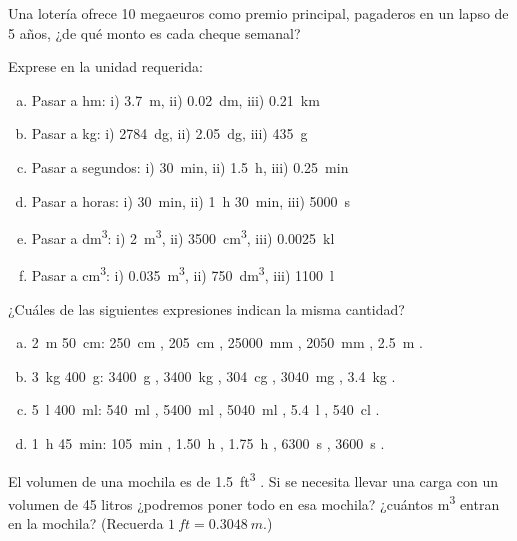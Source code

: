 \documentclass[11pt]{article}
\begin{document}
\begin{pregunta}
Una lotería ofrece 10 megaeuros como premio principal, pagaderos en un lapso de 5 años, ¿de qué monto es cada cheque semanal?
\end{pregunta}

\begin{exercise}
Exprese en la unidad requerida:
\begin{enumerate}[a)]
    \item Pasar a \unit{\hecto m}: i) \qty{3.7}{m}, ii) \qty{0.02}{\deca m}, iii) \qty{0.21}{\km}
    \item Pasar a \unit{\kg}: i) \qty{2784}{\deci g}, ii) \qty{2.05}{\deca g}, iii) \qty{435}{g}
    \item Pasar a segundos: i) \qty{30}{min}, ii) \qty{1.5}{h}, iii) \qty{0.25}{min}
    \item Pasar a horas: i) \qty{30}{min}, ii) \qty{1}{h} \qty{30}{min}, iii) \qty{5000}{s}
    \item Pasar a \unit{\deci m^3}: i) \qty{2}{m^3}, ii) \qty{3500}{cm^3}, iii) \qty{0.0025}{\kilo l}
    \item Pasar a \unit{\cm^3}: i) \qty{0.035}{m^3}, ii) \qty{750}{\deci m^3}, iii) \qty{1100}{l}
\end{enumerate}
\end{exercise}

\begin{exercise}
¿Cuáles de las siguientes expresiones indican la misma cantidad?
\begin{enumerate}[a)]
    \item \qty{2}{m} \qty{50}{cm}: \qty{250}{cm} \blank{}, \qty{205}{cm} \blank{}, \qty{25000}{\mm} \blank{}, \qty{2050}{\mm} \blank{}, \qty{2.5}{m} \blank{}.
    \item \qty{3}{kg} \qty{400}{g}: \qty{3400}{g} \blank{}, \qty{3400}{kg} \blank{}, \qty{304}{\centi g} \blank{}, \qty{3040}{\mg} \blank{}, \qty{3.4}{kg} \blank{}.
    \item \qty{5}{l} \qty{400}{ml}: \qty{540}{ml} \blank{}, \qty{5400}{ml} \blank{}, \qty{5040}{\milli l} \blank{}, \qty{5.4}{l} \blank{}, \qty{540}{\centi l} \blank{}.
    \item \qty{1}{h} \qty{45}{min}: \qty{105}{min} \blank{}, \qty{1.50}{h} \blank{}, \qty{1.75}{h} \blank{}, \qty{6300}{s} \blank{}, \qty{3600}{s} \blank{}.
\end{enumerate}
\end{exercise}

\begin{exercise}
    El volumen de una mochila es de \qty{1.5}{ft^3} . Si se necesita llevar una carga con un volumen de \num{45} litros ¿podremos poner todo en esa mochila? ¿cuántos \unit{m^3} entran en la mochila? (Recuerda $\qty{1}{ft} = \qty{0.3048}{m}$.)
\end{exercise}
\end{document}
